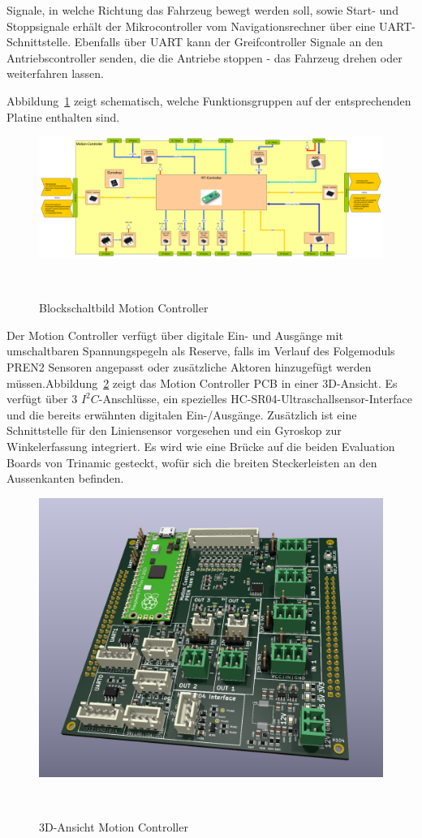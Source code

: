 \documentclass[main.tex]{subfiles} %
\begin{document}
Signale, in welche Richtung das Fahrzeug bewegt werden soll, sowie Start- und
Stoppsignale erhält der Mikrocontroller vom Navigationsrechner über eine
UART-Schnittstelle. Ebenfalls über UART kann der Greifcontroller Signale an den
Antriebscontroller senden, die die Antriebe stoppen - das Fahrzeug drehen oder
weiterfahren lassen.

Abbildung~\ref{fig:Blockschaltbild_Motioncontroller} zeigt schematisch, welche
Funktionsgruppen auf der entsprechenden Platine enthalten sind.

\begin{figure}[H]
    \centering
    \includegraphics[width = 1\linewidth]{fig_Antriebe_und_Dimensionierung/MotionController_Blockschaltbild.pdf}
    \caption{Blockschaltbild Motion Controller}~\label{fig:Blockschaltbild_Motioncontroller}
\end{figure}

Der Motion Controller verfügt über digitale Ein- und Ausgänge mit umschaltbaren
Spannungspegeln als Reserve, falls im Verlauf des Folgemoduls PREN2 Sensoren
angepasst oder zusätzliche Aktoren hinzugefügt werden
müssen.Abbildung~\ref{fig:MotionBoard_PCB} zeigt das Motion Controller PCB in
einer 3D-Ansicht. Es verfügt über 3 $I^2C$-Anschlüsse, ein spezielles
HC-SR04-Ultraschallsensor-Interface und die bereits erwähnten digitalen
Ein-/Ausgänge. Zusätzlich ist eine Schnittstelle für den Liniensensor
vorgesehen und ein Gyroskop zur Winkelerfassung integriert. Es wird wie eine
Brücke auf die beiden Evaluation Boards von Trinamic gesteckt, wofür sich die
breiten Steckerleisten an den Aussenkanten befinden.

\begin{figure}[H]
    \centering
    \includegraphics[width = 0.75\linewidth]{fig_Antriebe_und_Dimensionierung/MotionControllerPCB.jpg}
    \caption{3D-Ansicht Motion Controller}~\label{fig:MotionBoard_PCB}
\end{figure}
\end{document}
